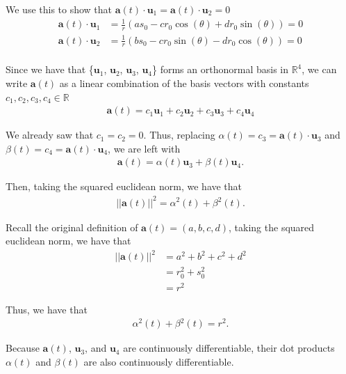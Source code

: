 \documentclass[12pt]{article}
\begin{document}
We use this to show that $\mathbf{a}(t) \cdot{} \mathbf{u}_1 = \mathbf{a}(t) \cdot{} \mathbf{u}_2 = 0 $
\begin{align*}
    \mathbf{a}(t) \cdot{} \mathbf{u}_1 & = \frac{1}{r}(as_0 -cr_0 \cos(\theta) + dr_0\sin(\theta)) = 0 \\
    \mathbf{a}(t) \cdot{} \mathbf{u}_2 & = \frac{1}{r}(bs_0 -cr_0 \sin(\theta) - dr_0\cos(\theta)) = 0 \\
\end{align*}

Since we have that \{$\mathbf{u}_1$, $\mathbf{u}_2$, $\mathbf{u}_3$, $\mathbf{u}_4$\} forms an orthonormal basis in $\mathbb{R}^4$,
we can write $\mathbf{a}(t)$ as a linear combination of the basis vectors with constants $c_1, c_2, c_3, c_4 \in{\mathbb{R}}$
\begin{align*}
    \mathbf{a}(t) = c_1\mathbf{u}_1 + c_2\mathbf{u}_2 + c_3\mathbf{u}_3 + c_4\mathbf{u}_4
\end{align*}

We already saw that $c_1 = c_2 = 0$. Thus, replacing $\alpha{}(t) = c_3 = \mathbf{a}(t) \cdot{\mathbf{u}_3}$ and  $\beta{}(t) = c_4 = \mathbf{a}(t) \cdot{\mathbf{u}_4}$, we are left with
\begin{align*}
    \mathbf{a}(t) =  \alpha{}(t) \mathbf{u}_3 + \beta{}(t) \mathbf{u}_4.
\end{align*}

Then, taking the squared euclidean norm, we have that
\begin{align*}
    ||\mathbf{a}(t)||^2 = \alpha{}^2(t) + \beta{}^2(t).
\end{align*}

Recall the original definition of $\mathbf{a}(t) = (a,b,c,d)$, taking the squared euclidean norm, we have that
\begin{align*}
    ||\mathbf{a}(t)||^2 & = a^2 + b^2 + c^2 + d^2 \\
                        & = r^2_0 + s^2_0         \\
                        & = r^2
\end{align*}

Thus, we have that
\begin{align*}
    \alpha{}^2(t) + \beta{}^2(t) = r^2.
\end{align*}

Because $\mathbf{a}(t)$, $\mathbf{u}_3$, and $\mathbf{u}_4$ are continuously differentiable, their dot products $\alpha(t)$ and $\beta(t)$ are also continuously differentiable.
\end{document}

